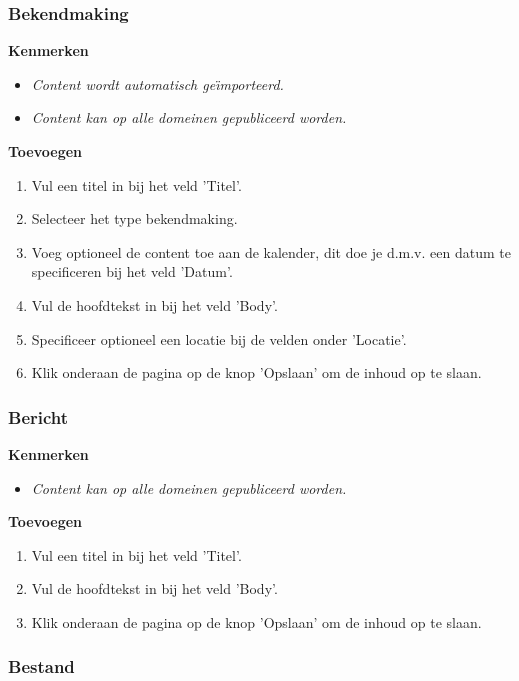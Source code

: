 \subsubsection{Bekendmaking}\label{bekendmaking}

\textbf{Kenmerken}

\begin{itemize}
\item \emph{Content wordt automatisch ge{\"\i}mporteerd.}
\item \emph{Content kan op alle domeinen gepubliceerd worden.}
\end{itemize}

\textbf{Toevoegen}

\begin{enumerate}
\item Vul een titel in bij het veld 'Titel'.
\item Selecteer het type bekendmaking.
\item Voeg optioneel de content toe aan de kalender, dit doe je d.m.v. een datum te specificeren bij het veld 'Datum'.
\item Vul de hoofdtekst in bij het veld 'Body'.
\item Specificeer optioneel een locatie bij de velden onder 'Locatie'.
\item Klik onderaan de pagina op de knop 'Opslaan' om de inhoud op te slaan.
\end{enumerate}

\subsubsection{Bericht}\label{bericht}

\textbf{Kenmerken}

\begin{itemize}
\item \emph{Content kan op alle domeinen gepubliceerd worden.}
\end{itemize}

\textbf{Toevoegen}

\begin{enumerate}
\item Vul een titel in bij het veld 'Titel'.
\item Vul de hoofdtekst in bij het veld 'Body'.
\item Klik onderaan de pagina op de knop 'Opslaan' om de inhoud op te slaan.
\end{enumerate}

\subsubsection{Bestand}\label{bestand}


